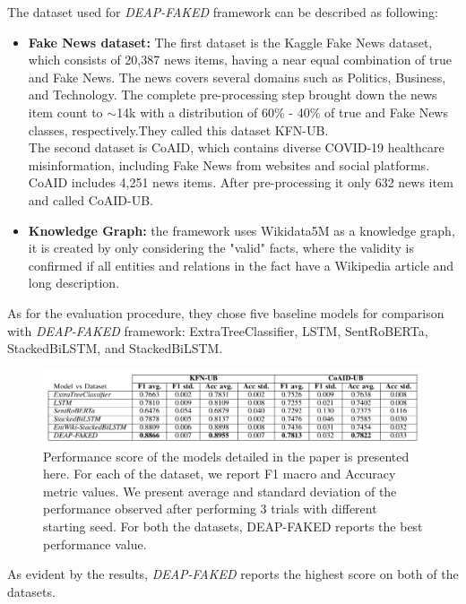 \documentclass[conference]{IEEEtran}
\begin{document}
\begin{appendices}
The dataset used for \textit{DEAP-FAKED} framework can be described as following:

\begin{itemize}
\item \textbf{Fake News dataset:} The first dataset is the Kaggle Fake News dataset, which consists of 20,387 news items, having a near equal combination of true and Fake News. The news covers several domains such as Politics, Business, and Technology.
The complete pre-processing step brought down the news item count to  $\sim$14k with a distribution of 60\% - 40\% of true and Fake News classes, respectively.They called this dataset KFN-UB.\\
The second dataset is CoAID, which contains diverse COVID-19 healthcare misinformation, including Fake News from websites and social platforms. CoAID includes 4,251 news items. After pre-processing it only 632 news item and called CoAID-UB.
\item \textbf{Knowledge Graph:} the framework uses Wikidata5M as a knowledge graph, it is created by only considering the "valid" facts, where the validity is confirmed if all entities and relations in the fact have a Wikipedia article and long description.
\end{itemize}

As for the evaluation procedure, they chose five baseline models for comparison with \textit{DEAP-FAKED} framework: ExtraTreeClassifier, LSTM, SentRoBERTa, StackedBiLSTM, and StackedBiLSTM.

\begin{figure}[htp]
	\centering
	\includegraphics[scale=0.4]{deap_faked_evaluation.png}
	\caption{Performance score of the models detailed in the paper is presented here. For each of the dataset, we report F1 macro and Accuracy metric values. We present average and standard deviation of the performance observed after performing 3 trials with different starting seed. For both the datasets, DEAP-FAKED reports the best performance value. \cite{mayank2021deap}}
\end{figure}

As evident by the results, \textit{DEAP-FAKED} reports the highest score on both of the datasets.



\end{appendices}
\end{document}
